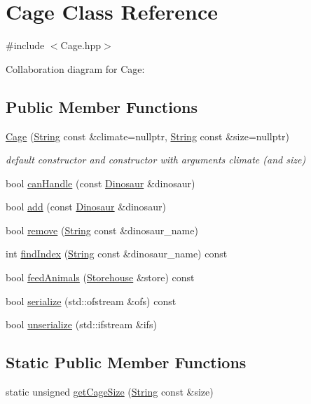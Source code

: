 \hypertarget{classCage}{}\section{Cage Class Reference}
\label{classCage}


{\ttfamily \#include $<$Cage.\+hpp$>$}



Collaboration diagram for Cage\+:
\subsection*{Public Member Functions}
\begin{DoxyCompactItemize}
\item 
\hyperlink{classCage_afbe886c9ec6a09ad2d8a00d46678f9af}{Cage} (\hyperlink{classString}{String} const \&climate=nullptr, \hyperlink{classString}{String} const \&size=nullptr)
\begin{DoxyCompactList}\small\item\em default constructor and constructor with arguments climate (and size) \end{DoxyCompactList}\item 
bool \hyperlink{classCage_acfe1a0e71ede403be924d0f95dca9d6b}{can\+Handle} (const \hyperlink{classDinosaur}{Dinosaur} \&dinosaur)
\item 
bool \hyperlink{classCage_af02dee37ba338f304219806d52b93b02}{add} (const \hyperlink{classDinosaur}{Dinosaur} \&dinosaur)
\item 
bool \hyperlink{classCage_aab085c5842eea748279b9a4593b8a076}{remove} (\hyperlink{classString}{String} const \&dinosaur\+\_\+name)
\item 
int \hyperlink{classCage_a0e06d978eb325ece904e6511ff41dd6a}{find\+Index} (\hyperlink{classString}{String} const \&dinosaur\+\_\+name) const
\item 
bool \hyperlink{classCage_a06119d2cf7fbff869584c09c5708d8a2}{feed\+Animals} (\hyperlink{classStorehouse}{Storehouse} \&store) const
\item 
bool \hyperlink{classCage_a1bcba33e73227c00ff1b6b5c13046f06}{serialize} (std\+::ofstream \&ofs) const
\item 
bool \hyperlink{classCage_af59c76e3bd8c691c19fee15ce4cb5b83}{unserialize} (std\+::ifstream \&ifs)
\end{DoxyCompactItemize}
\subsection*{Static Public Member Functions}
\begin{DoxyCompactItemize}
\item 
static unsigned \hyperlink{classCage_a2a8bc76e8e6e82510afef3384b4f4099}{get\+Cage\+Size} (\hyperlink{classString}{String} const \&size)
\end{DoxyCompactItemize}
